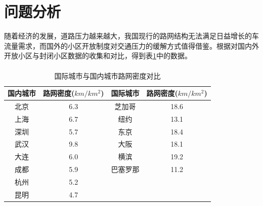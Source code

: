 \documentclass[fontset=windows,a4paper,12pt]{ctexart}
\newcommand{\upcite}[1]{\textsuperscript{\textsuperscript{\cite{#1}}}}
\begin{document}
  \section{问题分析}
  随着经济的发展，道路压力越来越大，我国现行的路网结构无法满足日益增长的车流量需求，而国外的小区开放制度对交通压力的缓解方式值得借鉴。根据对国内外开放小区与封闭小区数据的收集和对比，得到表\ref{tab:net_density}中的数据。
  \begin{table}[!htbp]
	\centering
	\caption{国际城市与国内城市路网密度对比\upcite{国外街区制是如何完美炼成}}
	\label{tab:net_density}
	\begin{tabular}{cc|cc}
		\toprule[1pt]
		国内城市 & 路网密度($km/km^2$) & 国际城市 & 路网密度($km/km^2$) \\ 
		\hline%
		北京 & 6.3 & 芝加哥 & 18.6 \\ 
		上海 & 6.7 & 纽约 & 13.1 \\ 
		深圳 & 5.7 & 东京 & 18.4 \\ 
		武汉 & 9.8 & 大阪 & 18.1 \\ 
		大连 & 6.0 & 横滨 & 19.2 \\ 
		成都 & 5.9 & 巴塞罗那 & 11.2 \\ 
		杭州 & 5.2 &  &  \\ 
		昆明 & 4.7 &  &  \\ 
		\bottomrule[1pt]
	\end{tabular} 
  \end{table}
  
\end{document}
